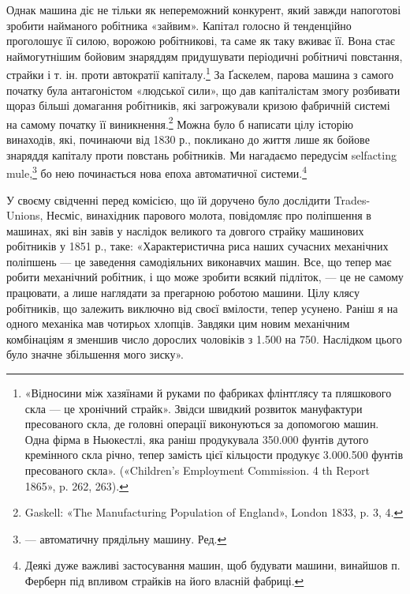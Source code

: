 Однак машина діє не тільки як непереможний конкурент,
який завжди напоготові зробити найманого робітника «зайвим».
Капітал голосно й тенденційно проголошує її силою, ворожою
робітникові, та саме як таку вживає її. Вона стає наймогутнішим
бойовим знаряддям придушувати періодичні робітничі повстання,
страйки і т. ін. проти автократії капіталу.\footnote{
«Відносини між хазяїнами й руками по фабриках флінтґлясу та пляшкового
скла — це хронічний страйк». Звідси швидкий розвиток мануфактури
пресованого скла, де головні операції виконуються за допомогою машин.
Одна фірма в Ньюкестлі, яка раніш продукувала 350.000 фунтів дутого
кремінного скла річно, тепер замість цієї кільцости продукує 3.000.500
фунтів пресованого скла». («Children’s Employment Commission. 4 th
Report 1865», p. 262, 263).
} За Ґаскелем,
парова машина з самого початку була антагоністом «людської
сили», що дав капіталістам змогу розбивати щораз більші
домагання робітників, які загрожували кризою фабричній системі
на самому початку її виникнення.\footnote{
Gaskell: «The Manufacturing Population of England», London
1833, p. 3, 4.
} Можна було б написати
цілу історію винаходів, які, починаючи від 1830 р., покликано
до життя лише як бойове знаряддя капіталу проти повстань робітників.
Ми нагадаємо передусім selfacting mule,\footnote*{
— автоматичну прядільну машину. Ред.
} бо нею починається
нова епоха автоматичної системи.\footnote{
Деякі дуже важливі застосування машин, щоб будувати машини,
винайшов п. Ферберн під впливом страйків на його власній фабриці.
}

У своєму свідченні перед комісією, що їй доручено було дослідити
Trades-Unions, Несміс, винахідник парового молота, повідомляє
про поліпшення в машинах, які він завів у наслідок
великого та довгого страйку машинових робітників у 1851 р.,
таке: «Характеристична риса наших сучасних механічних поліпшень
— це заведення самодіяльних виконавчих машин. Все, що
тепер має робити механічний робітник, і що може зробити всякий
підліток, — це не самому працювати, а лише наглядати за прегарною
роботою машини. Цілу клясу робітників, що залежить
виключно від своєї вмілости, тепер усунено. Раніш я на одного
механіка мав чотирьох хлопців. Завдяки цим новим механічним
комбінаціям я зменшив число дорослих чоловіків з 1.500 на 750.
Наслідком цього було значне збільшення мого зиску».

